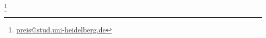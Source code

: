 \begin{titlepage}
    \begin{addmargin}[-1cm]{-3cm}
    \begin{center}
        \large

        \hfill

        \vfill

        \begingroup
            \color{CTtitle}\spacedallcaps{\myTitle} \\ \bigskip
        \endgroup

        \spacedlowsmallcaps{\myName}\footnote{\href{mailto:preis@stud.uni-heidelberg.de}{preis@stud.uni-heidelberg.de}}
        

        \vfill

        \myTime

        \vfill

    \end{center}
  \end{addmargin}
\end{titlepage}
